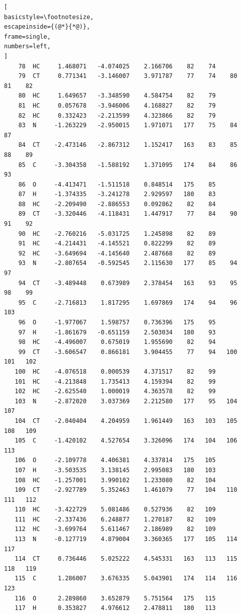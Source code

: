 \documentclass[a4paper,11pt]{scrartcl}
\begin{document}
\begin{lstlisting}[
basicstyle=\footnotesize,
escapeinside={(@*}{*@)},
frame=single,
numbers=left,
]
    78  HC     1.468071   -4.074025    2.166706    82    74
    79  CT     0.771341   -3.146007    3.971787    77    74    80    81    82
    80  HC     1.649657   -3.348590    4.584754    82    79
    81  HC     0.057678   -3.946006    4.168827    82    79
    82  HC     0.332423   -2.213599    4.323866    82    79
    83  N     -1.263229   -2.950015    1.971071   177    75    84    87
    84  CT    -2.473146   -2.867312    1.152417   163    83    85    88    89
    85  C     -3.304358   -1.588192    1.371095   174    84    86    93
    86  O     -4.413471   -1.511518    0.848514   175    85
    87  H     -1.374335   -3.241278    2.929597   180    83
    88  HC    -2.209490   -2.886553    0.092862    82    84
    89  CT    -3.320446   -4.118431    1.447917    77    84    90    91    92
    90  HC    -2.760216   -5.031725    1.245898    82    89
    91  HC    -4.214431   -4.145521    0.822299    82    89
    92  HC    -3.649694   -4.145640    2.487668    82    89
    93  N     -2.807654   -0.592545    2.115630   177    85    94    97
    94  CT    -3.489448    0.673989    2.378454   163    93    95    98    99
    95  C     -2.716813    1.817295    1.697869   174    94    96   103
    96  O     -1.977067    1.598757    0.736396   175    95
    97  H     -1.861679   -0.651159    2.503034   180    93
    98  HC    -4.496007    0.675019    1.955690    82    94
    99  CT    -3.606547    0.866181    3.904455    77    94   100   101   102
   100  HC    -4.076518    0.000539    4.371517    82    99
   101  HC    -4.213848    1.735413    4.159394    82    99
   102  HC    -2.625540    1.000019    4.363578    82    99
   103  N     -2.872020    3.037369    2.212580   177    95   104   107
   104  CT    -2.040404    4.204959    1.961449   163   103   105   108   109
   105  C     -1.420102    4.527654    3.326096   174   104   106   113
   106  O     -2.109778    4.406381    4.337814   175   105
   107  H     -3.503535    3.138145    2.995083   180   103
   108  HC    -1.257001    3.990102    1.233080    82   104
   109  CT    -2.927789    5.352463    1.461079    77   104   110   111   112
   110  HC    -3.422729    5.081486    0.527936    82   109
   111  HC    -2.337436    6.248877    1.270187    82   109
   112  HC    -3.699764    5.611467    2.186989    82   109
   113  N     -0.127719    4.879004    3.360365   177   105   114   117
   114  CT     0.736446    5.025222    4.545331   163   113   115   118   119
   115  C      1.286007    3.676335    5.043901   174   114   116   123
   116  O      2.289860    3.652879    5.751564   175   115
   117  H      0.353827    4.976612    2.478811   180   113

\end{lstlisting}
\end{document}
